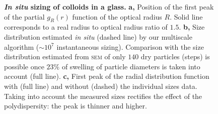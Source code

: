 \documentclass[8.5pt,twoside,twocolumn]{article}
\begin{document}
\begin{figure}
	\caption{\textbf{\emph{In situ} sizing of colloids in a glass.} \textbf{a,} Position of the first peak of the partial $g_R(r)$ function of the optical radius $R$. Solid line corresponds to a real radius to optical radius ratio of $1.5$. \textbf{b,} Size distribution estimated \emph{in situ} (dashed line) by our multiscale algorithm ($\sim 10^7$ instantaneous sizing). Comparison with the size distribution estimated from \textsc{sem} of only $140$ dry particles (steps) is possible once $23\%$ of swelling of particle diameters is taken into account (full line). \textbf{c,} First peak of the radial distribution function with (full line) and without (dashed) the individual sizes data. Taking into account the measured sizes rectifies the effect of the polydispersity: the peak is thinner and higher.}
	\label{fig:sizing}
\end{figure}
\end{document}
